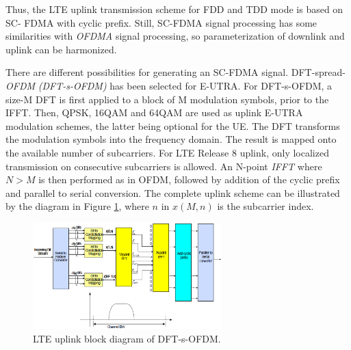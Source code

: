 Thus, the LTE uplink transmission scheme for FDD and TDD mode is based on SC-
FDMA with cyclic prefix. Still, SC-FDMA signal processing has some similarities
with \textit{OFDMA} signal processing, so parameterization of downlink and
uplink can be harmonized.

There are different possibilities for generating an SC-FDMA signal. DFT-spread-
\textit{OFDM} \textit{(DFT-s-OFDM)} has been selected for E-UTRA. For
DFT-s-OFDM, a size-M DFT is first applied to a block of M modulation symbols,
prior to the IFFT. Then, QPSK, 16QAM and 64QAM are used as uplink E-UTRA
modulation schemes, the latter being optional for the UE. The DFT transforms the
modulation symbols into the frequency domain. The result is mapped onto the
available number of subcarriers. For LTE Release 8 uplink, only localized
transmission on consecutive subcarriers is allowed. An N-point \textit{IFFT}
where $N>M$ is then performed as in OFDM, followed by addition of the cyclic
prefix and parallel to serial conversion. The complete uplink scheme can be
illustrated by the diagram in Figure \ref{fig:uplinkbd}, where $n$ in $x(M,n)$
is the subcarrier index.

\begin{figure}[htbp]
    \centering
    \includegraphics[width=0.65\textwidth]{./figures/uplink_scheme}
    \caption{ LTE uplink block diagram of DFT-s-OFDM.
    \label{fig:uplinkbd}}
\end{figure}
